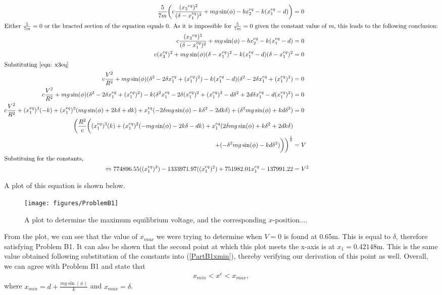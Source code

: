 \documentclass[a4paper,10pt,reqno]{amsart}
\numberwithin{equation}{section}
\begin{document}
\begin{align}
\frac{5}{7m}\bigg(c \frac{({x_3}^{eq})^2}{(\delta - x_1^{eq})^2} + mg\sin(\phi) - bx_2^{eq} - k(x_1^{eq}-d)\bigg) &= 0 \nonumber \\
\intertext{Either $\frac{5}{7m} = 0$ or the bracted section of the equation equals 0. As it is impossible for $\frac{5}{7m} = 0$ given the constant value of $m$, this leads to the following conclusion:}
c \frac{({x_3}^{eq})^2}{(\delta - x_1^{eq})^2} + mg\sin(\phi) - bx_2^{eq} - k(x_1^{eq}-d) &= 0 \nonumber \\
c(x_3^{eq})^2 + mg\sin(\phi)(\delta - x_1^{eq})^2 - k(x_1^{eq} - d)(\delta - x_1^{eq})^2 &= 0 \nonumber \\
\intertext{Substituting \ref{eqn: x3eq}}
c\frac{V^2}{R^2} + mg\sin(\phi)(\delta^2 - 2 \delta x_1^{eq} + (x_1^{eq})^2) - k(x_1^{eq} - d)(\delta^2 - 2 \delta x_1^{eq} + (x_1^{eq})^2) &= 0 \nonumber \\
c\frac{V^2}{R^2} + mg\sin(\phi)(\delta^2 - 2 \delta x_1^{eq} + (x_1^{eq})^2) - k(\delta^2 x_1^{eq} - 2\delta (x_1^{eq})^2 + (x_1^{eq})^3 -d\delta^2 + 2d\delta x_1^{eq} - d(x_1^{eq})^2) &= 0 \nonumber \\
c\frac{V^2}{R^2} + (x_1^{eq})^3(-k) + (x_1^{eq})^2(mg\sin(\phi) + 2k\delta +dk) + x_1^{eq}(-2\delta mg\sin(\phi) - k\delta^2 -2dk\delta) + (\delta^2mg\sin(\phi) + kd\delta^2) &= 0 \nonumber \\
\bigg(\frac{R^2}{c}\bigg((x_1^{eq})^3(k) + (x_1^{eq})^2(-mg\sin(\phi) - 2k\delta -dk) + x_1^{eq}(2\delta mg\sin(\phi) + k\delta^2 +2dk\delta) \nonumber \\  + (-\delta^2mg\sin(\phi) - kd\delta^2)\bigg)\bigg)^\frac{1}{2} &= V \nonumber \\ 
\intertext{Substituing for the constants,}
\Leftrightarrow 774896.55((x_1^{eq})^3) - 1333971.97((x_1^{eq})^2) + 751982.01x_1^{eq} - 137991.22 &= V^2 \label{eqn: B1deriv}
\end{align}

A plot of this equation is shown below.
\begin{figure}[h]
\centering
\texttt{[image: figures/ProblemB1]}
\caption{A plot to determine the maximum equilibrium voltage, and the corresponding $x$-position....}
\label{fig:B1plot}
\end{figure}

From the plot, we can see that the value of $x_{max}$ we were trying to determine when $V = 0$ is found at 0.65m. This is equal to $\delta$, therefore satisfying Problem B1. It can also be shown that the second point at which this plot meets the x-axis is at $x_1 = 0.42148$m. This is the same value obtained following substitution of the constants into (\ref{PartB1xmin}), thereby verifying our derivation of this point as well.
Overall, we can agree with Problem B1 and state that
\begin{align}
x_{min} < x^e < x_{max},
\end{align}
where $x_{min} = d + \frac{mg\sin(\phi)}{k}$ and $x_{max} = \delta$.
\end{document}
